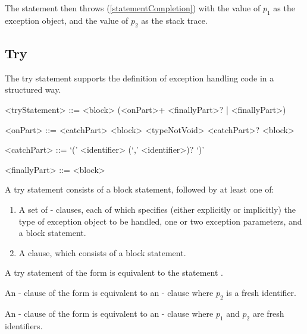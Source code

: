 \documentclass[makeidx]{article}
\begin{document}
{\LMHash{}%
The \RETHROW{} statement then throws (\ref{statementCompletion})
with the value of $p_1$ as the exception object,
and the value of $p_2$ as the stack trace.


\subsection{Try}

\LMHash{}%
The try statement supports the definition of exception handling code
in a structured way.

\begin{grammar}
<tryStatement> ::= \TRY{} <block> (<onPart>+ <finallyPart>? | <finallyPart>)

<onPart> ::= <catchPart> <block>
  \alt \ON{} <typeNotVoid> <catchPart>? <block>

<catchPart> ::= \CATCH{} `(' <identifier> (`,' <identifier>)? `)'

<finallyPart> ::= \FINALLY{} <block>
\end{grammar}

\LMHash{}%
A try statement consists of a block statement, followed by at least one of:
\begin{enumerate}
\item
  A set of \ON{}-\CATCH{} clauses, each of which specifies
  (either explicitly or implicitly)
  the type of exception object to be handled,
  one or two exception parameters,
  and a block statement.
\item
A \FINALLY{} clause, which consists of a block statement.
\end{enumerate}


\LMHash{}%
A try statement of the form
is equivalent to the statement
.

\LMHash{}%
An \ON{}-\CATCH{} clause of the form
is equivalent to an \ON{}-\CATCH{} clause
where $p_2$ is a fresh identifier.

\LMHash{}%
An \ON{}-\CATCH{} clause of the form
is equivalent to an \ON{}-\CATCH{} clause
where $p_1$ and $p_2$ are fresh identifiers.

}
\end{document}
